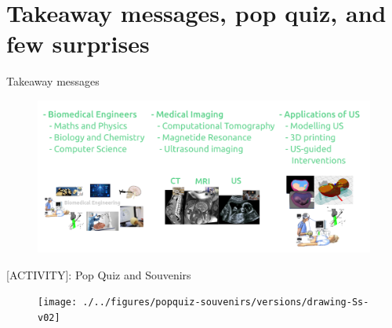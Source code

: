 \section{Takeaway messages, pop quiz, and few surprises}



{
\begin{frame}{Takeaway messages}
  \begin{figure}
  \centering
  \includegraphics[width=1.0\textwidth]{./../figures/takeaways/versions/drawing-v04}
  \end{figure}

\end{frame}
}

{
\begin{frame}{[\faUsers ACTIVITY]: Pop Quiz and Souvenirs}
  \begin{figure}
  \centering
  \texttt{[image: ./../figures/popquiz-souvenirs/versions/drawing-Ss-v02]}
  \end{figure}

\end{frame}
}


